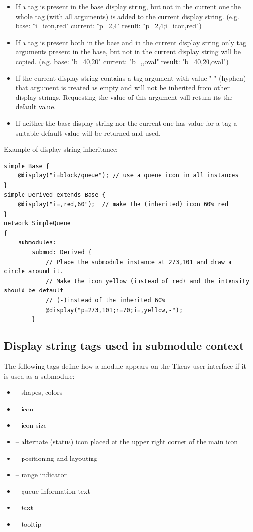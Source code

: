 \begin{itemize}
  \item If a tag is present in the base display string, but not in the current one
        the whole tag (with all arguments) is added to the current display string.
        (e.g. base: "i=icon,red" current: "p=2,4" result: "p=2,4;i=icon,red")
  \item If a tag is present both in the base and in the current display string
        only tag arguments present in the base, but not in the current display string
        will be copied.
        (e.g. base: "b=40,20" current: "b=,,oval" result: "b=40,20,oval")
  \item If the current display string contains a tag argument with value "-" (hyphen)
        that argument is treated as empty and will not be inherited from other
        display strings. Requesting the value of this argument will return its the
        default value.
  \item If neither the base display string nor the current one has value for a tag
        a suitable default value will be returned and used.
\end{itemize}

Example of display string inheritance:
\begin{verbatim}
simple Base {
    @display("i=block/queue"); // use a queue icon in all instances
}
simple Derived extends Base {
    @display("i=,red,60");  // make the (inherited) icon 60% red
}
network SimpleQueue
{
    submodules:
        submod: Derived {
            // Place the submodule instance at 273,101 and draw a circle around it.
            // Make the icon yellow (instead of red) and the intensity should be default
            // (-)instead of the inherited 60%
            @display("p=273,101;r=70;i=,yellow,-");
        }
\end{verbatim}


\subsection{Display string tags used in submodule context}

The following tags define how a module appears on the Tkenv user interface
if it is used as a submodule:
\begin{itemize}
  \item{ -- shapes, colors}
  \item{ -- icon}
  \item{ -- icon size}
  \item{ -- alternate (status) icon placed at the upper right corner of the main icon}
  \item{ -- positioning and layouting}
  \item{ -- range indicator}
  \item{ -- queue information text}
  \item{ -- text}
  \item{ -- tooltip}
\end{itemize}

